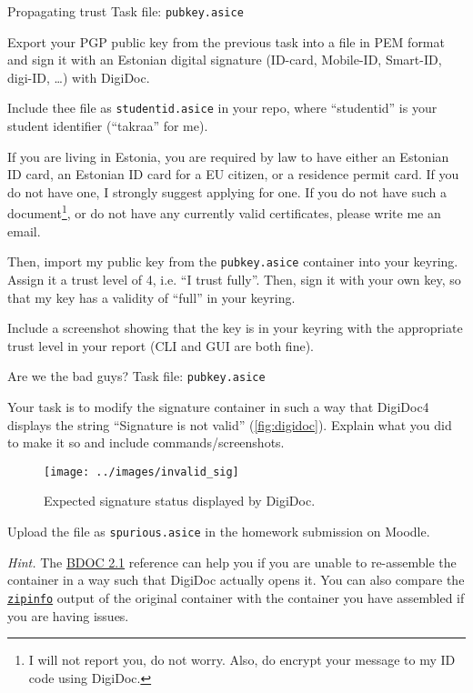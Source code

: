 \documentclass{homework}
\begin{document}
\begin{task}{Propagating trust}
  Task file: \texttt{pubkey.asice}

  Export your PGP public key from the previous task into a file in PEM format and sign it with an Estonian digital signature (ID-card, Mobile-ID, Smart-ID, digi-ID, \dots) with DigiDoc.
  
  Include thee file as \texttt{studentid.asice} in your repo, where \enquote{studentid} is your student identifier (\enquote{takraa} for me).
  \begin{tcolorbox}
    If you are living in Estonia, you are required by law to have either an Estonian ID card, an Estonian ID card for a EU citizen, or a residence permit card.
    If you do not have one, I strongly suggest applying for one.
    \tcblower
    If you do not have such a document\footnote{I will not report you, do not worry. Also, do encrypt your message to my ID code using DigiDoc.}, or do not have any currently valid certificates, please write me an email.
  \end{tcolorbox}

  Then, import my public key from the \texttt{pubkey.asice} container into your keyring.
  Assign it a trust level of 4, i.e. \enquote{I trust fully}.
  Then, sign it with your own key, so that my key has a validity of \enquote{full} in your keyring.

  Include a screenshot showing that the key is in your keyring with the appropriate trust level in your report (CLI and GUI are both fine).
\end{task}

\newpage

\begin{task}{Are we the bad guys?}
  Task file: \texttt{pubkey.asice}

  Your task is to modify the signature container in such a way that DigiDoc4 displays the string \enquote{Signature is not valid} (\autoref{fig:digidoc}).
  Explain what you did to make it so and include commands/screenshots.

  \begin{figure}[h!]
    \center
    \texttt{[image: ../images/invalid\_sig]}
    \caption{Expected signature status displayed by DigiDoc.}
    \label{fig:digidoc}
  \end{figure}

  Upload the file as \texttt{spurious.asice} in the homework submission on Moodle.

  \textit{Hint.}
  The \href{https://www.id.ee/wp-content/uploads/2021/06/bdoc-spec212-eng.pdf}{BDOC 2.1} reference can help you if you are unable to re-assemble the container in a way such that DigiDoc actually opens it.
  You can also compare the \href{https://man.freebsd.org/cgi/man.cgi?query=zipinfo}{\texttt{zipinfo}} output of the original container with the container you have assembled if you are having issues.
\end{task}
\end{document}
